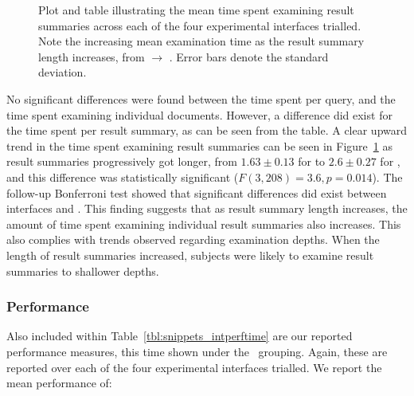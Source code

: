 \begin{figure}[t!]
    \centering
    \caption[Time per result summary]{Plot and table illustrating the mean time spent examining result summaries across each of the four experimental interfaces trialled. Note the increasing mean examination time as the result summary length increases, from  $\rightarrow$ . Error bars denote the standard deviation.}
    \label{fig:time_snippet}
\end{figure}

No significant differences were found between the time spent per query, and the time spent examining individual documents. However, a difference did exist for the time spent per result summary, as can be seen from the table. A clear upward trend in the time spent examining result summaries can be seen in Figure~\ref{fig:time_snippet} as result summaries progressively got longer, from $1.63\pm0.13$ for  to $2.6\pm0.27$ for , and this difference was statistically significant ($F(3,208) = 3.6, p=0.014$). The follow-up Bonferroni test showed that significant differences did exist between interfaces  and . This finding suggests that as result summary length increases, the amount of time spent examining individual result summaries also increases. This also complies with trends observed regarding examination depths. When the length of result summaries increased, subjects were likely to examine result summaries to shallower depths.

\subsubsection{Performance}
Also included within Table~\ref{tbl:snippets_intperftime} are our reported performance measures, this time shown under the ~grouping. Again, these are reported over each of the four experimental interfaces trialled. We report the mean performance of:

